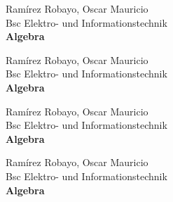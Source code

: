 \documentclass{book}
\begin{document}
\thispagestyle{empty}
\begin{flushright}Ramírez Robayo, Oscar Mauricio\\Bsc Elektro- und Informationstechnik\\\textbf{Algebra}\end{flushright}\noindent\makebox[\linewidth]{\rule{\paperwidth}{0.4pt}}
\clearpage
\thispagestyle{empty}
\begin{flushright}Ramírez Robayo, Oscar Mauricio\\Bsc Elektro- und Informationstechnik\\\textbf{Algebra}\end{flushright}\noindent\makebox[\linewidth]{\rule{\paperwidth}{0.4pt}}
\clearpage
\thispagestyle{empty}
\begin{flushright}Ramírez Robayo, Oscar Mauricio\\Bsc Elektro- und Informationstechnik\\\textbf{Algebra}\end{flushright}\noindent\makebox[\linewidth]{\rule{\paperwidth}{0.4pt}}\clearpage
\thispagestyle{empty}
\begin{flushright}Ramírez Robayo, Oscar Mauricio\\Bsc Elektro- und Informationstechnik\\\textbf{Algebra}\end{flushright}\noindent\makebox[\linewidth]{\rule{\paperwidth}{0.4pt}}
\end{document}
